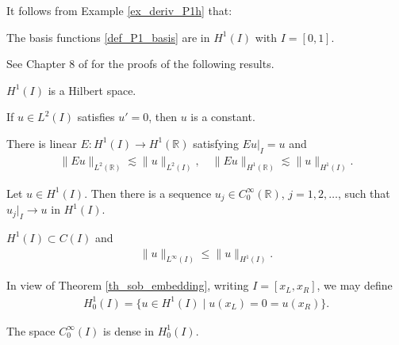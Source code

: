 \documentclass[12pt,oneside,final]{amsart}
\def\R{\mathbb R}
\begin{document}
It follows from Example \ref{ex_deriv_P1h} that: 

\begin{example}\label{ex_P1_basis}
The basis functions \eqref{def_P1_basis} are in $H^1(I)$ with $I = [0,1]$.
\end{example}

See Chapter 8 of \cite{Brezis} for the proofs of the following results.

\begin{theorem}
$H^1(I)$ is a Hilbert space.
\end{theorem}

\begin{lemma}
If $u \in L^2(I)$ satisfies $u' = 0$, then $u$ is a constant. 
\end{lemma}

\begin{theorem}[Extension, Th. 8.6]
There is linear $E : H^1(I) \to H^1(\R)$
satisfying $E u|_{I} = u$ and
    \begin{align*}
\|E u\|_{L^2(\R)} \lesssim \|u\|_{L^2(I)},
\quad 
\|E u\|_{H^1(\R)} \lesssim \|u\|_{H^1(I)}.
    \end{align*}
\end{theorem}

\begin{theorem}[Density in $H^1$, Th. 8.7]\label{th_density_H1}
Let $u \in H^1(I)$. Then there is a sequence $u_j \in C_0^\infty(\R)$, $j=1,2,\dots$, such that $u_j|_{I} \to u$ in $H^1(I)$.
\end{theorem}

\begin{theorem}\label{th_sob_embedding}
$H^1(I) \subset C(I)$ and 
    \begin{align*}
\|u\|_{L^\infty(I)} \le \|u\|_{H^1(I)}.
    \end{align*}
\end{theorem}

In view of Theorem \ref{th_sob_embedding}, writing $I=[x_L, x_R]$, we may define
    \begin{align*}
H_0^1(I) = \{u \in H^1(I) \mid u(x_L) = 0 = u(x_R) \}.
    \end{align*}

\begin{theorem}[Density in $H^1_0$, Th. 8.12]\label{th_density_H01}
The space $C_0^\infty(I)$ is dense in $H^1_0(I)$.
\end{theorem}
\end{document}

